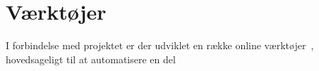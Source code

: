 \section{Værktøjer}
I forbindelse med projektet er der udviklet en række online værktøjer~\cite{minitools}, hovedsageligt til at automatisere en del